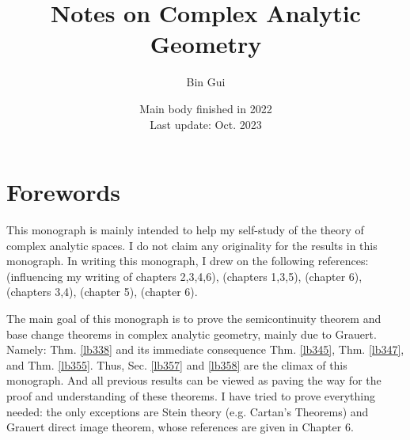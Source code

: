 \documentclass[12pt,b5paper,notitlepage]{report}
\title{Notes on Complex Analytic Geometry}
\author{{\sc Bin Gui}
}
\date{\footnotesize Main body finished in 2022\\Last update: Oct. 2023}
\theoremstyle{definition}
\theoremstyle{plain}
\numberwithin{equation}{section}
\begin{document}
\sloppy %
	\setcounter{page}{1}
	\setcounter{section}{-1}
	






	
	\maketitle



\makeatletter
\newcommand*{\toccontents}{}
\makeatother
\toccontents



	


\newpage


\chapter*{Forewords}

This monograph is mainly intended to help my self-study of the theory of complex analytic spaces. I do not claim any originality for the results in this monograph. In writing this monograph, I drew on the following references: \cite{GR-b} (influencing my writing of chapters 2,3,4,6), \cite{Fis} (chapters 1,3,5), \cite{BS} (chapter 6), \cite{GPR} (chapters 3,4), \cite{Vak17} (chapter 5), \cite{Dem} (chapter 6).

The main goal of this monograph is to prove the semicontinuity theorem and base change theorems in complex analytic geometry, mainly due to Grauert. Namely: Thm. \ref{lb338} and its immediate consequence Thm. \ref{lb345}, Thm. \ref{lb347}, and Thm. \ref{lb355}. Thus, Sec. \ref{lb357} and \ref{lb358} are the climax of this monograph. And all previous results can be viewed as paving the way for the proof and  understanding of these theorems. I have tried to prove everything needed: the only exceptions are Stein theory (e.g. Cartan's Theorems) and Grauert direct image theorem, whose references are given in Chapter 6. 
\end{document}
